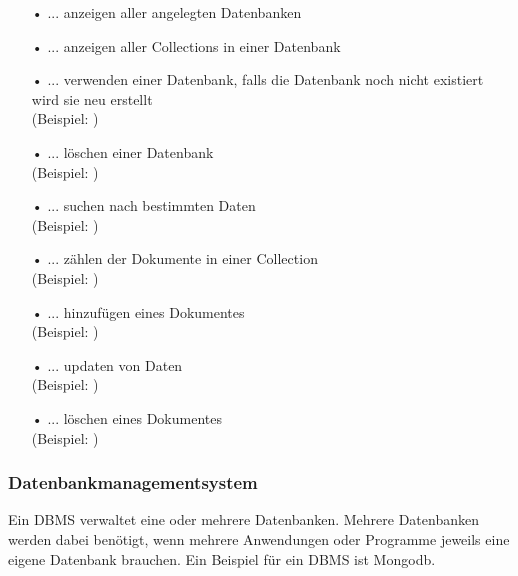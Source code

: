 \begin{itemize} 
\item[•] \textbf{} ... anzeigen aller angelegten Datenbanken
\item[•] \textbf{} ... anzeigen aller Collections in einer Datenbank
\item[•] \textbf{} ... verwenden einer Datenbank, falls die Datenbank noch nicht existiert wird sie neu erstellt 
\\     (Beispiel:  )
\item[•] \textbf{} ... löschen einer Datenbank
\\     (Beispiel:  )
\item[•] \textbf{} ... suchen nach bestimmten Daten 
\\     (Beispiel:  )
\item[•] \textbf{} ... zählen der Dokumente in einer Collection
\\     (Beispiel:  )
\item[•] \textbf{} ... hinzufügen eines Dokumentes
\\     (Beispiel:  )
\item[•] \textbf{} ... updaten von Daten
\\     (Beispiel:  )
\item[•] \textbf{} ... löschen eines Dokumentes
\\     (Beispiel:  )
\end{itemize}

\subsubsection{Datenbankmanagementsystem}
Ein \ac{DBMS} verwaltet eine oder mehrere Datenbanken. Mehrere Datenbanken werden dabei benötigt, wenn mehrere Anwendungen oder Programme jeweils eine eigene Datenbank brauchen. Ein Beispiel für ein \ac{DBMS} ist Mongodb.

